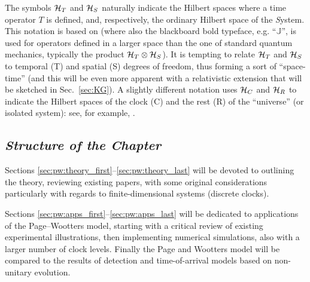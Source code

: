 The symbols $\mathcal{H}_T$ and $\mathcal{H}_S$
naturally indicate
the Hilbert spaces where a time operator $T$ is defined,
and, respectively,
the ordinary Hilbert space of the \emph{S}ystem.
This notation is based on \citereset\cite{Lloyd:Time}
(where also the blackboard bold typeface, e.g. ``$\mathbb{J}$'',
is used for operators defined in a larger space
than the one of standard quantum mechanics,
typically the product $\mathcal{H}_T \otimes \mathcal{H}_S$).
It is tempting to relate $\mathcal{H}_T$ and $\mathcal{H}_S$
to temporal (T) and spatial (S)
degrees of freedom, thus forming a sort of
``space-time'' (and this will be even more apparent
with a relativistic extension that will be sketched in Sec.~\ref{sec:KG}).
%
A slightly different notation
uses $\mathcal{H}_C$ and $\mathcal{H}_R$
to indicate the Hilbert spaces of the clock (C) and the rest (R) of the ``universe''
(or isolated system):
see, for example, \cite{Marletto:Evolution}.

\subsection*{\it Structure of the Chapter}

Sections \ref{sec:pw:theory_first}--\ref{sec:pw:theory_last}
will be devoted to outlining the theory, reviewing existing papers,
with some original considerations particularly with regards to
finite-dimensional systems (discrete clocks).

Sections \ref{sec:pw:apps_first}--\ref{sec:pw:apps_last} will be dedicated to
applications of the Page--Wootters model, starting with a critical review of existing experimental illustrations,
then implementing numerical simulations, also with a larger number of clock levels.
Finally the Page and Wootters model will be compared to the results of
detection and time-of-arrival models
based on non-unitary evolution.

